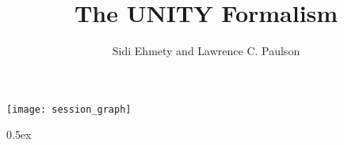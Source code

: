 \documentclass[10pt,a4paper,twoside]{article}
\begin{document}
\pagestyle{headings}

\title{The UNITY Formalism}
\author{Sidi Ehmety and Lawrence C. Paulson}
\maketitle

\tableofcontents

\begin{center}
  \texttt{[image: session\_graph]}  
\end{center}

\newpage

\parindent 0pt\parskip 0.5ex


\end{document}
